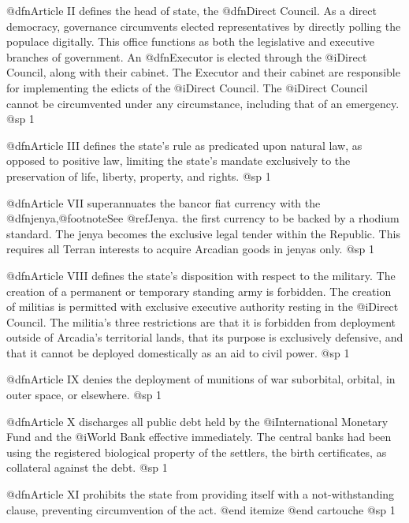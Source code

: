 \item
@dfn{Article II} defines the head of state, the @dfn{Direct Council}. As a direct democracy, governance circumvents elected representatives by directly polling the populace digitally. This office functions as both the legislative and executive branches of government. An @dfn{Executor} is elected through the @i{Direct Council}, along with their cabinet. The Executor and their cabinet are responsible for implementing the edicts of the @i{Direct Council}. The @i{Direct Council} cannot be circumvented under any circumstance, including that of an emergency.
@sp 1

\item
@dfn{Article III} defines the state's rule as predicated upon natural law, as opposed to positive law, limiting the state's mandate exclusively to the preservation of life, liberty, property, and rights.
@sp 1

\item
@dfn{Article VII} superannuates the bancor fiat currency with the @dfn{jenya},@footnote{See @ref{Jenya}.} the first currency to be backed by a rhodium standard. The jenya becomes the exclusive legal tender within the Republic. This requires all Terran interests to acquire Arcadian goods in jenyas only.
@sp 1

\item
@dfn{Article VIII} defines the state's disposition with respect to the military. The creation of a permanent or temporary standing army is forbidden. The creation of militias is permitted with exclusive executive authority resting in the @i{Direct Council}. The militia's three restrictions are that it is forbidden from deployment outside of Arcadia's territorial lands, that its purpose is exclusively defensive, and that it cannot be deployed domestically as an aid to civil power.
@sp 1

\item
@dfn{Article IX} denies the deployment of munitions of war suborbital, orbital, in outer space, or elsewhere.
@sp 1

\item
@dfn{Article X} discharges all public debt held by the @i{International Monetary Fund} and the @i{World Bank} effective immediately. The central banks had been using the registered biological property of the settlers, the birth certificates, as collateral against the debt.
@sp 1

\item
@dfn{Article XI} prohibits the state from providing itself with a not-withstanding clause, preventing circumvention of the act.
@end itemize
@end cartouche
@sp 1

